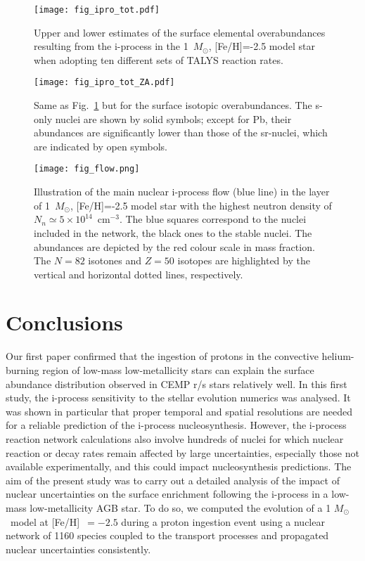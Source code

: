 \documentclass{aa}
\def\Msun{$M_{\odot}$}
\begin{document}
\begin{figure}
\texttt{[image: fig\_ipro\_tot.pdf]}
\caption{Upper and lower estimates of the surface elemental overabundances resulting from the i-process in the 1~\Msun{}, [Fe/H]=-2.5 model star when adopting ten different sets of {\sf TALYS} reaction rates.}
\label{fig_ipro_tot}
\end{figure}

\begin{figure}
\texttt{[image: fig\_ipro\_tot\_ZA.pdf]}
\caption{Same as Fig.~\ref{fig_ipro_tot} but for the surface isotopic overabundances. The s-only nuclei are shown by solid symbols; except for Pb, their abundances are significantly lower than those of the sr-nuclei, which are indicated by open symbols.}
\label{fig_ipro_tot_ZA}
\end{figure}

\begin{figure}
\texttt{[image: fig\_flow.png]}
\caption{Illustration of the main nuclear i-process flow (blue line) in the layer of 1~\Msun{}, [Fe/H]=-2.5 model star with the highest neutron density of $N_n \simeq 5 \times 10^{14}$~cm$^{-3}$. The blue squares correspond to the nuclei included in the network, the black ones to the stable nuclei. The abundances are depicted by the red colour scale in mass fraction. The $N=82$ isotones and $Z=50$ isotopes are highlighted by the vertical and horizontal dotted lines,
respectively.}
\label{fig_flow}
\end{figure}


\section{Conclusions}
\label{sect_conc}
Our first paper \citep{Choplin21} confirmed that the ingestion of protons in the convective helium-burning region of low-mass low-metallicity stars can explain the surface abundance distribution observed in CEMP r/s stars  relatively well. In this first study, the i-process sensitivity to the stellar evolution numerics was analysed. It was shown in particular that proper temporal and spatial resolutions are needed for a reliable prediction of the i-process nucleosynthesis. However,  the i-process reaction network calculations also involve hundreds of nuclei for which nuclear reaction or decay rates remain affected by large uncertainties, especially those not available experimentally, and this could impact nucleosynthesis predictions. The aim of the present study was to carry out a detailed analysis of the impact of  nuclear uncertainties on the surface enrichment following the i-process in a low-mass low-metallicity AGB star. To do so, we computed the evolution of a 1 \Msun\ model at [Fe/H]~$=-2.5$ during a proton ingestion event using a nuclear network of 1160 species coupled to the transport processes and propagated nuclear uncertainties consistently.
\end{document}
